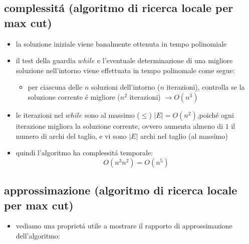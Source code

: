 
\subsection*{complessit\'a (algoritmo di ricerca locale per max cut)}
\begin{flushleft}
	\begin{itemize}
		\item la soluzione iniziale viene banalmente ottenuta in tempo polinomiale
		\item il test della guardia $while$ e l'eventuale determinazione di una migliore soluzione nell'intorno viene effettuata in tempo polinomale come segue:
		\begin{itemize}
			\item per ciascuna delle $n$ soluzioni dell'intorno ($n$ iterazioni), controlla se la soluzione corrente \'e migliore ($n^2$ iterazioni) $\rightarrow O(n^3)$
		\end{itemize}
		\item le iterazioni nel $while$ sono al massimo ($\leq$) $\vert E\vert=O(n^2)$,poich\'e ogni iterazione migliora la soluzione corrente, ovvero aumenta  almeno di $1$ il numero di archi del taglio, e vi sono $\vert E\vert$ archi nel taglio (al massimo)
		\item quindi l'algoritmo ha complessit\'a temporale:
			$$O(n^3n^2)=O(n^5)$$
	\end{itemize}
\end{flushleft}


\subsection*{approssimazione (algoritmo di ricerca locale per max cut)}
\begin{flushleft}
	\begin{itemize}
		\item vediamo una propriet\'a utile a mostrare il rapporto di approssimazione dell'algoritmo:
	\end{itemize}
\end{flushleft}

